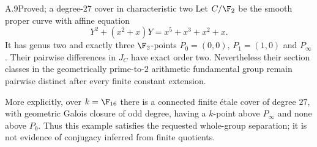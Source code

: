 \begin{claim}{A.9}{Proved; a degree-$27$ cover in characteristic two}
Let $C/\F_2$ be the smooth proper curve with affine equation
\[
 Y^2+(x^2+x)Y=x^5+x^3+x^2+x.
\]
It has genus two and exactly three $\F_2$-points
$P_0=(0,0)$, $P_1=(1,0)$ and $P_\infty$. Their pairwise
differences in $J_C$ have exact order two. Nevertheless their
section classes in the geometrically prime-to-$2$ arithmetic
fundamental group remain pairwise distinct after every finite
constant extension.

More explicitly, over $k=\F_{16}$ there is a connected finite
\'etale cover of degree $27$, with geometric Galois closure of odd
degree, having a $k$-point above $P_\infty$ and none above $P_0$.
Thus this example satisfies the requested whole-group separation;
it is not evidence of conjugacy inferred from finite quotients.
\end{claim}
